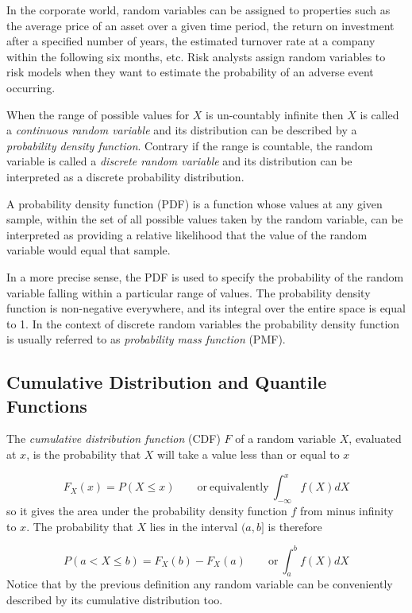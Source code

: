 In the corporate world, random variables can be assigned to properties such as the average price of an 
asset over a given time period, the return on investment after a specified number of years, the estimated 
turnover rate at a company within the following six months, etc. Risk analysts assign random variables 
to risk models when they want to estimate the probability of an adverse event occurring. 

When the range of possible values for \(X\) is un-countably infinite then \(X\) 
is called a \emph{continuous random variable} and its distribution can be described by a
\emph{probability density function}.
Contrary if the range is countable, the random
variable is called a \emph{discrete random variable} and its
distribution can be interpreted as a discrete probability distribution.

A probability density function (PDF) is a function whose values at any given sample,
within the set of all possible values taken by the random variable, 
can be interpreted as providing a relative likelihood that the value of the random variable
would equal that sample. 

In a more precise sense, the PDF is used to specify the probability of the random variable falling 
within a particular range of values.
The probability density function is non-negative everywhere, and its integral over the entire space 
is equal to 1.
In the context of discrete random variables the probability density function is usually referred 
to as \emph{probability mass function} (PMF).

\subsection{Cumulative Distribution and Quantile Functions}\label{quantile-function}

The \emph{cumulative distribution function} (CDF) \(F\) of a random variable \(X\), 
evaluated at \(x\), is the probability that \(X\) will take a value less than or equal to \(x\)

\begin{equation}
	F_X(x) = P(X \le x)\qquad\mathrm{or~equivalently}~\int_{-\infty}^{x}{f(X)dX}
\end{equation}
so it gives the area under the probability density function \(f\) from
minus infinity to \(x\).
The probability that \(X\) lies in the interval \((a,b]\) is therefore

\begin{equation}
	P(a\lt X \le b)=F_{X}(b)-F_{X}(a)\qquad\mathrm{or}~\int_a^b{f(X)dX}
\end{equation}
Notice that by the previous definition any random variable can be conveniently described by its 
cumulative distribution too.

